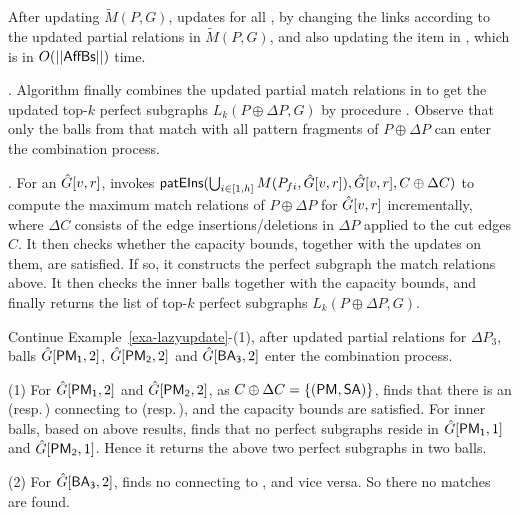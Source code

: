 \vspace{0.5ex}
 After updating $\tilde{M}(P,G)$,
\incp updates \fb for all \affballsx, by changing the links according to the updated partial relations in $\tilde{M}(P,G)$, and also updating the  item in \bs, which is in $O(||{\mathsf{AffBs}}||)$ time.



. Algorithm \incp finally combines the updated partial match relations in \affballsx to get the updated top-$k$ perfect subgraphs $L_{k}(P\oplus \Delta P,G)$ by procedure \comb. Observe that only the balls from \affballsx that match with all pattern fragments of $P\oplus \Delta P$ can enter the combination process.



. For an \affballx $\hat{G}{[v,r]}$, \comb invokes ${\mathsf{patEIns}}(\bigcup_{i\in [1, h]}M(P_{fi},\hat{G}{[v,r]}), \hat{G}{[v,r]}, C\oplus \Delta C)$
to compute the maximum match relations of $P\oplus \Delta P$ for $\hat{G}{[v,r]}$ incrementally,
where $\Delta C$ consists of the edge insertions/deletions in $\Delta P$ applied to the cut edges $C$.
It then checks whether the capacity bounds, together with the updates on them, are satisfied.
If so, it constructs the perfect subgraph \wrt the match relations above.
It then checks the inner balls together with the capacity bounds, and finally returns the list of top-$k$ perfect subgraphs $L_{k}(P\oplus \Delta P,G)$.



\begin{example}
\label{exa-combination}
Continue Example~\ref{exa-lazyupdate}-(1), after \incp updated partial relations for \affballsx \wrt $\Delta P_3$,
balls $\hat{G}{[{\mathsf{PM_1}},2]}$, $\hat{G}{[{\mathsf{PM_2}},2]}$ and $\hat{G}{[{\mathsf{BA_3}},2]}$ enter the combination process.

\sstab
(1) For $\hat{G}{[{\mathsf{PM_1}},2]}$ and $\hat{G}{[{\mathsf{PM_2}},2]}$, as $C\oplus \Delta C=\{({\mathsf{PM}},{\mathsf{SA}})\}$,
\comb finds that there is an  (resp.\,) connecting to  (resp.\,),
and the capacity bounds are satisfied.
For inner balls, based on above results, \comb finds that no perfect subgraphs reside in $\hat{G}{[{\mathsf{PM_1}},1]}$ and $\hat{G}{[{\mathsf{PM_2}},1]}$.
Hence it returns the above two perfect subgraphs in two balls.

\sstab
(2) For $\hat{G}{[{\mathsf{BA_3}},2]}$, \comb finds no  connecting to , and vice versa.
So there no matches are found.
\end{example}


